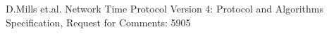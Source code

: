 
\begin{thebibliography}{9}

	D.Mills et.al.
	Network Time Protocol Version 4: Protocol and Algorithms Specification, 
	Request for Comments: 5905

\end{thebibliography}